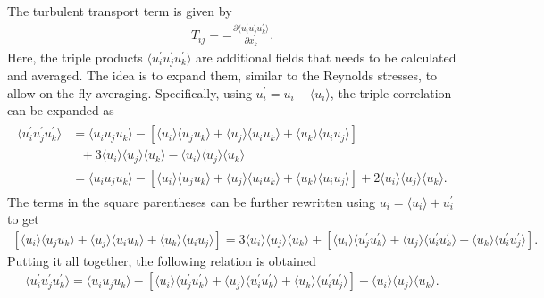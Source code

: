 The turbulent transport term is given by
\begin{align}
    T_{ij} = - \frac{\partial \langle u^{\prime}_i u^{\prime}_j u^{\prime}_k \rangle}{\partial x_k} .
\end{align}
Here, the triple products $\langle u^{\prime}_i u^{\prime}_j u^{\prime}_k \rangle$ are additional fields  that needs to be calculated and averaged.
The idea is to expand them, similar to the Reynolds stresses, to allow on-the-fly averaging.
Specifically, using $u^{\prime}_i = u_i - \langle u_i \rangle$, the triple correlation can be expanded as
\begin{align}
    \begin{split}
            \langle u^{\prime}_i u^{\prime}_j u^{\prime}_k \rangle 
        &= 
        \langle u_i u_j u_k \rangle 
        - 
        \left[ \langle u_i \rangle \langle u_j u_k \rangle + \langle u_j \rangle \langle u_i u_k \rangle + \langle u_k \rangle \langle u_i u_j \rangle  \right]
        \\ 
        & \ \ \ + 3 \langle u_i \rangle \langle u_j \rangle \langle u_k \rangle  -
        \langle u_i \rangle \langle u_j \rangle \langle u_k \rangle
        \\
        &= 
        \langle u_i u_j u_k \rangle 
        - 
        \left[ \langle u_i \rangle \langle u_j u_k \rangle + \langle u_j \rangle \langle u_i u_k \rangle + \langle u_k \rangle \langle u_i u_j \rangle  \right]
        +
        2 \langle u_i \rangle \langle u_j \rangle \langle u_k \rangle .
    \end{split}
\end{align}
The terms in the square parentheses can be further rewritten using $u_i = \langle u_i \rangle + u^{\prime}_i$ to get
\begin{align}
    \left[ \langle u_i \rangle \langle u_j u_k \rangle + \langle u_j \rangle \langle u_i u_k \rangle + \langle u_k \rangle \langle u_i u_j \rangle  \right]
    =
    3  \langle u_i \rangle \langle u_j \rangle \langle u_k \rangle
    + 
    \left[ \langle u_i \rangle \langle u^{\prime}_j u^{\prime}_k \rangle + \langle u_j \rangle \langle u^{\prime}_i u^{\prime}_k \rangle + \langle u_k \rangle \langle u^{\prime}_i u^{\prime}_j \rangle  \right] .
\end{align}
Putting it all together, the following relation is obtained
\begin{align}
\label{eq:transport_term_implementation}
    \langle u^{\prime}_i u^{\prime}_j u^{\prime}_k \rangle 
    = 
    \langle u_i u_j u_k \rangle  
    - 
    \left[ \langle u_i \rangle \langle u^{\prime}_j u^{\prime}_k \rangle + \langle u_j \rangle \langle u^{\prime}_i u^{\prime}_k \rangle + \langle u_k \rangle \langle u^{\prime}_i u^{\prime}_j \rangle  \right]
    -
    \langle u_i \rangle \langle u_j \rangle \langle u_k \rangle.
\end{align}
